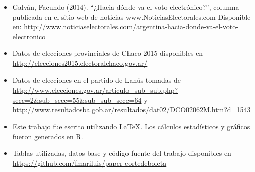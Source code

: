 \documentclass[12pt,a4paper]{article}
\begin{document}
\begin{itemize}
  \item Galván, Facundo (2014). “¿Hacia dónde va el voto electrónico?”, columna publicada en el sitio web de noticias www.NoticiasElectorales.com Disponible en: http://www.noticiaselectorales.com/argentina-hacia-donde-va-el-voto-electronico
  \item Datos de elecciones provinciales de Chaco 2015 disponibles en \url{http://elecciones2015.electoralchaco.gov.ar/}
  \item Datos de elecciones en el partido de Lanús tomadas de
    \url{http://www.elecciones.gov.ar/articulo_sub_sub.php?secc=2&sub_secc=55&sub_sub_secc=64}
    y \url{http://www.resultadosba.gob.ar/resultados/dat02/DCO02062M.htm?d=1543}
  \item Este trabajo fue escrito utilizando \LaTeX. Los cálculos estadísticos y
    gráficos fueron generados en R.
  \item Tablas utilizadas, datos base y código fuente del trabajo disponibles en \url{https://github.com/fmariluis/paper-cortedeboleta}
\end{itemize}

\pagebreak

\tableofcontents
\listoftables
\listoffigures
\end{document}
